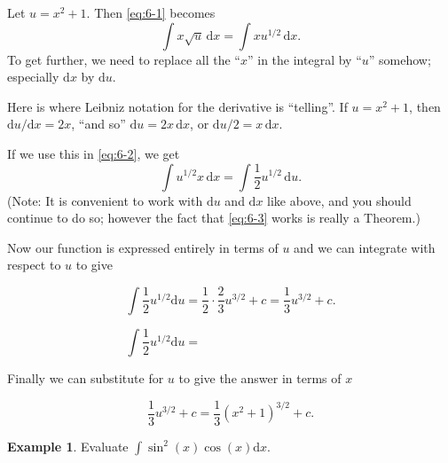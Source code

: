 \documentclass[
  english,
  11pt,
  oneside]{book}
\newcommand{\slide}{}
\theoremstyle{definition}
\theoremstyle{definition}
\newtheorem{example}{Example}[chapter]
\theoremstyle{definition}
\theoremstyle{definition}
\theoremstyle{remark}
\begin{document}
\slide

Let \(u = x^2+ 1\). Then \eqref{eq:6-1} becomes
\begin{equation}
\int x\sqrt{u}\,\mathrm{d}x=\int xu^{1/2}\,\mathrm{d}x.
\label{eq:6-2}
\end{equation}
To get further, we need to replace all the ``\(x\)'' in the integral by ``\(u\)'' somehow; especially \(\mathrm{d}x\) by \(\mathrm{d}u\).

Here is where Leibniz notation for the derivative is ``telling''.
If \(u = x^2+ 1\), then \(\mathrm{d}u/\mathrm{d}x = 2x\), ``and so'' \(\mathrm{d}u = 2x\,\mathrm{d}x\), or \(\mathrm{d}u/2 = x\,\mathrm{d}x\).

If we use this in \eqref{eq:6-2}, we get
\begin{equation}
\int u^{1/2}x\,\mathrm{d}x = \int\frac12u^{1/2}\,\mathrm{d}u.
\label{eq:6-3}
\end{equation}
(Note: It is convenient to work with \(\mathrm{d}u\) and \(\mathrm{d}x\) like above, and you should continue to do so; however the fact that \eqref{eq:6-3} works is really a Theorem.)

\slide

Now our function is expressed entirely in terms of \(u\) and we can integrate with respect to \(u\) to give

\begin{notslides}

\[
\int\frac12u^{1/2}\mathrm{d}u = \frac 12\cdot\frac23u^{3/2}+c = \frac13u^{3/2}+c.
\]

\end{notslides}

\begin{slidesonly}

\[
\int\frac12u^{1/2}\mathrm{d}u = \phantom{\frac 12\cdot\frac23u^{3/2}+c = \frac13u^{3/2}+c.}
\]

\end{slidesonly}

Finally we can substitute for \(u\) to give the answer in terms of \(x\)

\begin{notslides}

\[
\frac 13u^{3/2}+c = \frac13(x^2+1)^{3/2}+c.
\]

\end{notslides}

\slide

\begin{example}
Evaluate \(\displaystyle\int\sin^2(x)\cos(x)\mathrm{d}x\).
\end{example}
\end{document}
